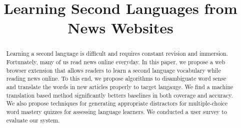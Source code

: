 \documentclass[11pt]{article}
\title{Learning Second Languages from News Websites}
\date{}
\begin{document}
\maketitle
\begin{abstract}


Learning a second language is difficult and requires
constant revision and immersion.  Fortunately, many of us 
read news online everyday. In this paper, we propose a web browser extension that allows readers to learn a second language vocabulary 
while reading news online. To this end, we propose algorithms to disambiguate  word sense and translate the words in new articles properly 
to target langauge.
We find a machine translation based method significantly betters baselines in both coverage and accuracy.
We also propose techniques for generating appropriate distractors for multiple-choice word mastery quizzes for assessing language learners.
We conducted a user survey to evaluate our system.

\end{abstract}

%

%

%
%
%

%
%



\end{document}
